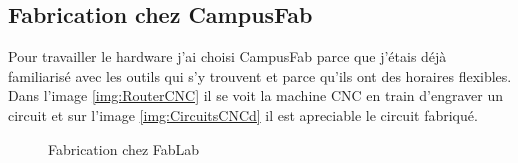 \documentclass[12pt]{article}
\begin{document}
\subsection{Fabrication chez CampusFab}
\begin{par}
	Pour travailler le hardware j'ai choisi CampusFab parce que j'étais déjà
	familiarisé avec les outils qui s'y trouvent et parce qu'ils ont des horaires
	flexibles. Dans l'image \ref{img:RouterCNC} il se voit la machine CNC en train d'engraver un circuit et sur
	l'image \ref{img:CircuitsCNCd} il est apreciable
	le circuit fabriqué.
\end{par}

\begin{figure}[!htb]
	\centering
	\caption{Fabrication chez FabLab}
	\label{img:CampusFab}
\end{figure}


\end{document}
